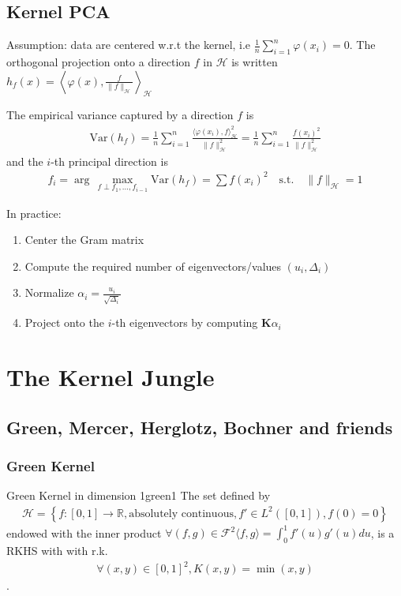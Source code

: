 \documentclass[10pt]{article}
\begin{document}
\subsection{Kernel PCA}
Assumption: data are centered w.r.t the kernel, i.e $ \frac{1}{n}\sum_{i=1}^n
\varphi(x_i) = 0$.
The orthogonal projection onto a direction $f$ in $\mathcal{H}$ is written 
$h_f(x) = \left\langle \varphi(x), \frac{f}{\lVert f\rVert_\mathcal{H}} 
\right\rangle_\mathcal{H}$

The empirical variance captured by a direction $f$ is 
\begin{align*}
  \text{Var}(h_f) = \frac{1}{n}\sum_{i=1}^n\frac{\langle \varphi(x_i), f 
  \rangle^2_\mathcal{H}}{\lVert f\rVert_\mathcal{H}^2} = 
  \frac{1}{n}\sum_{i=1}^n\frac{f(x_i)^2}{\lVert f\rVert_\mathcal{H}^2}
\end{align*}
and the $i$-th principal direction is 
\begin{align*}
  f_i = \arg\,\max_{f \perp {f_1, ..., f_{i-1}}} \text{Var}(h_f) = 
  \sum f(x_i)^2
   \quad 
  \text{s.t.}  \quad \lVert f\rVert_\mathcal{H} = 1
\end{align*}

In practice: 
\begin{enumerate}
  \item Center the Gram matrix
  \item Compute the required number of eigenvectors/values $(u_i, \Delta_i)$
  \item Normalize $\alpha_i = \frac{u_i}{\sqrt{\Delta_i}}$
  \item Project onto the $i$-th eigenvectors by computing $\mathbf{K}\alpha_i$
\end{enumerate}

\section{The Kernel Jungle}

\subsection{Green, Mercer, Herglotz, Bochner and friends}

\subsubsection{Green Kernel}

\begin{Theorem}{Green Kernel in dimension 1}{green1}
  The set defined by
  \begin{align*}
    \mathcal{H} = \left\{f: [0, 1] \rightarrow \mathbb{R}, \text{absolutely 
    continuous}, f' \in L^2([0, 1]), f(0) = 0 \right\}
  \end{align*}
  endowed with the inner product $\forall (f, g) \in \mathcal{F}^2 \langle f, g
  \rangle = \int_0^1 f'(u)g'(u)du$, 
  is a RKHS with with r.k.
  \begin{align*}
    \forall (x, y) \in [0, 1]^2, K(x, y) = \min(x, y)
  \end{align*}.
\end{Theorem}
\end{document}
